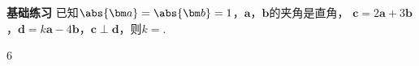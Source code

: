 \begin{Theorem}[平面向量基本定理]
\begin{exercise}{{\textbf{基础练习}}}
      已知$\abs{\bm a}=\abs{\bm b}=1$，$\bm a$，$\bm b$的夹角是直角，
      $\bm c=2\bm a+3\bm b$，$\bm d=k\bm a-4\bm b$，$\bm c\perp\bm d$，则$k=$\tk.
      \begin{answer}
        6
      \end{answer}
  \end{exercise}
\newpage

\end{Theorem}
